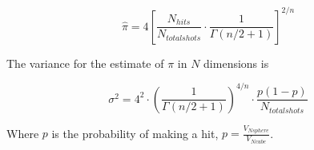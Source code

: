 \documentclass[11pt]{amsart}
\begin{document}
\begin{equation}
\hat \pi = 4 \left[ \frac{N_{hits}}{N_{totalshots}} \cdot \frac{1}{\Gamma(n/2+1)} \right] ^{2/n}
\end{equation}
\vspace{5 mm}

The variance for the estimate of $\pi$ in $N$ dimensions is 

\begin{equation}
\sigma ^2 = 4^2 \cdot \left( \frac{1}{\Gamma(n/2+1)} \right) ^{4/n} \cdot \frac{p (1-p)}{N_{totalshots}}
\end{equation}
\vspace{5 mm}

Where $p$ is the probability of making a hit, $p= \frac{V_{Nsphere}}{V_{Ncube}}$.
\end{document}
